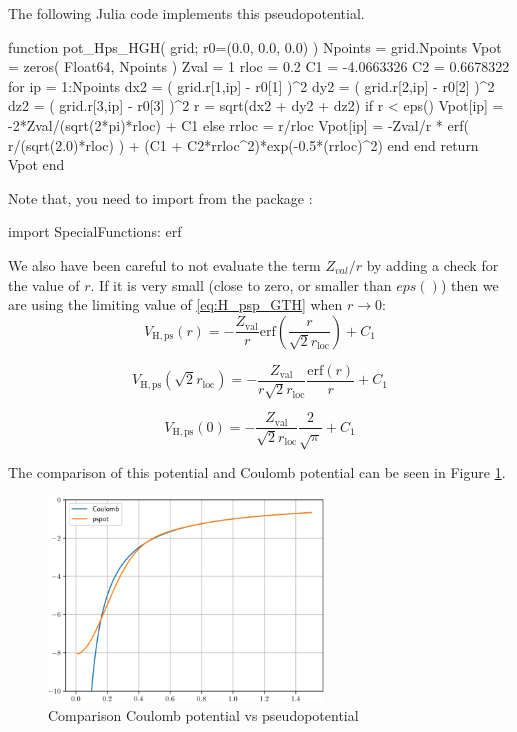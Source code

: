 The following Julia code implements this pseudopotential.
\begin{juliacode}
function pot_Hps_HGH( grid; r0=(0.0, 0.0, 0.0) )
  Npoints = grid.Npoints
  Vpot = zeros( Float64, Npoints )
  Zval = 1
  rloc = 0.2
  C1 = -4.0663326
  C2 = 0.6678322
  for ip = 1:Npoints
    dx2 = ( grid.r[1,ip] - r0[1] )^2
    dy2 = ( grid.r[2,ip] - r0[2] )^2
    dz2 = ( grid.r[3,ip] - r0[3] )^2
    r = sqrt(dx2 + dy2 + dz2)
    if r < eps()
      Vpot[ip] = -2*Zval/(sqrt(2*pi)*rloc) + C1
    else
      rrloc = r/rloc
      Vpot[ip] = -Zval/r * erf( r/(sqrt(2.0)*rloc) ) + (C1 + C2*rrloc^2)*exp(-0.5*(rrloc)^2)
    end
  end
  return Vpot
end
\end{juliacode}
Note that, you need to import  from the package :
\begin{juliacode}
import SpecialFunctions: erf
\end{juliacode}
We also have been careful to not evaluate the term $Z_{val}/r$ by adding a check for the value of $r$.
If it is very small (close to zero, or smaller than $eps()$) then we are using the limiting
value of \ref{eq:H_psp_GTH} when $r \rightarrow 0$:
\begin{equation}
V_{\mathrm{H,ps}}(r) = -\frac{Z_{\mathrm{val}}}{r}
  \mathrm{erf}\left( \frac{r}{\sqrt{2}r_{\mathrm{loc}}} \right) + C_{1}
\end{equation}

\begin{equation}
V_{\mathrm{H,ps}}(\sqrt{2}r_{\mathrm{loc}} ) = -\frac{Z_{\mathrm{val}}}{r \sqrt{2}r_{\mathrm{loc}}}
  \frac{\mathrm{erf}(r)}{r} + C_{1}
\end{equation}

\begin{equation}
V_{\mathrm{H,ps}}(0) = -\frac{Z_{\mathrm{val}}}{\sqrt{2}r_{\mathrm{loc}}}
  \frac{2}{\sqrt{\pi}} + C_{1}
\end{equation}

The comparison of this potential and Coulomb potential can be seen in
Figure \ref{fig:compare_H_pspot}.
\begin{figure}[H]
{\centering
\includegraphics[width=0.65\textwidth]{../codes/sch_3d/IMG_H_Coulomb_vs_pspot.pdf}
\par}
\caption{Comparison Coulomb potential vs pseudopotential}
\label{fig:compare_H_pspot}
\end{figure}

